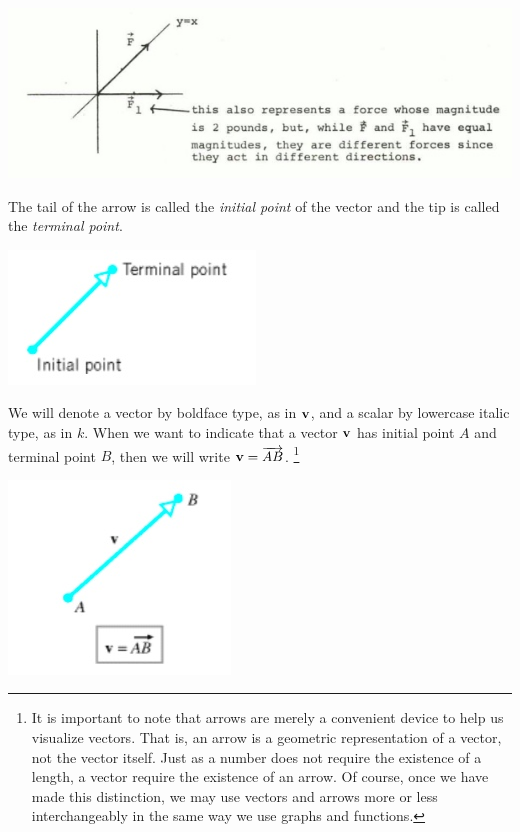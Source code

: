 \documentclass[12pt,letterpaper,reqno]{article}
\numberwithin{equation}{section}
\newcommand{\ti}[1]{\textit{#1}}
\begin{document}
\begin{center}
	\includegraphics[scale=0.5]{figures_mvc/force_example}
\end{center}
The tail of the arrow is called the \ti{initial point} of the vector and the tip is called the \ti{terminal point}. 
\begin{center}
	\includegraphics[scale=0.5]{figures_mvc/directed_line_segment}
\end{center}
We will denote a vector by boldface type, as in ${\bf v}$, and a scalar by lowercase italic type, as in $k$. When we want to indicate that a vector ${\bf v}$ has initial point $A$ and terminal point $B$, then we will write ${\bf v}=\overrightarrow{AB}$. \footnote{It is important to note that arrows are merely a convenient device to help us visualize vectors. That is, an arrow is a geometric representation of a vector, not the vector itself. Just as a number does not require the existence of a length, a vector require the existence of an arrow. Of course, once we have made this distinction, we may use vectors and arrows more or less interchangeably in the same way we use graphs and functions.}
\begin{center}
	\includegraphics[scale=0.5]{figures_mvc/vAB}
\end{center}
\end{document}
